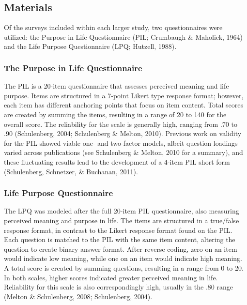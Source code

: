 \documentclass[english,man, mask]{apa6}
\theoremstyle{definition}
\theoremstyle{definition}
\theoremstyle{definition}
\theoremstyle{remark}
\begin{document}
\subsection{Materials}\label{materials}

Of the surveys included within each larger study, two questionnaires
were utilized: the Purpose in Life Questionnaire (PIL; Crumbaugh \&
Maholick, 1964) and the Life Purpose Questionnaire (LPQ; Hutzell, 1988).

\subsubsection{The Purpose in Life
Questionnaire}\label{the-purpose-in-life-questionnaire}

The PIL is a 20-item questionnaire that assesses perceived meaning and
life purpose. Items are structured in a 7-point Likert type response
format; however, each item has different anchoring points that focus on
item content. Total scores are created by summing the items, resulting
in a range of 20 to 140 for the overall score. The reliability for the
scale is generally high, ranging from .70 to .90 (Schulenberg, 2004;
Schulenberg \& Melton, 2010). Previous work on validity for the PIL
showed viable one- and two-factor models, albeit question loadings
varied across publications (see Schulenberg \& Melton, 2010 for a
summary), and these fluctuating results lead to the development of a
4-item PIL short form (Schulenberg, Schnetzer, \& Buchanan, 2011).

\subsubsection{Life Purpose
Questionnaire}\label{life-purpose-questionnaire}

The LPQ was modeled after the full 20-item PIL questionnaire, also
measuring perceived meaning and purpose in life. The items are
structured in a true/false response format, in contrast to the Likert
response format found on the PIL. Each question is matched to the PIL
with the same item content, altering the question to create binary
answer format. After reverse coding, zero on an item would indicate low
meaning, while one on an item would indicate high meaning. A total score
is created by summing questions, resulting in a range from 0 to 20. In
both scales, higher scores indicated greater perceived meaning in life.
Reliability for this scale is also correspondingly high, usually in the
.80 range (Melton \& Schulenberg, 2008; Schulenberg, 2004).
\end{document}
